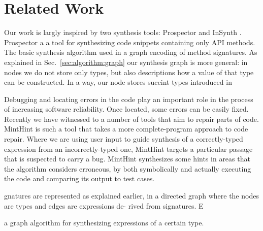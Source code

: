 \section{Related Work}
\label{sec:related}

Our work is largly inspired by two synthesis tools: Prospector \cite{MandelinetALL2005Jungloid} and InSynth \cite{GveroETAL13CompleteCompletionTypesWeights, DBLP:conf/cav/GveroKP11}.
Prospector a a tool for synthesizing code snippets containing only API methods. The basic synthesis algorithm used in  a graph encoding of method signatures. As explained in Sec.~\ref{sec:algorithm:graph}
our synthesis graph is more general: in nodes we do not store only types, but also descriptions how a value of that type can be constructed. In a way, our node stores succint types introduced in  \cite{GveroETAL13CompleteCompletionTypesWeights}




Debugging and locating errors in the code \cite{Pavlinovic:2014,
  Chandra:2011:AD} play an important role in the process of increasing
software reliability. Once located, some errors can be easily
fixed. Recently we have witnessed to a number of tools that aim to
repair parts of code. MintHint \cite{MintHint} is such a tool that
takes a more complete-program approach to code repair. Where we are
using user input to guide synthesis of a correctly-typed expression
from an incorrectly-typed one, MintHint targets a particular passage
that is suspected to carry a bug. MintHint synthesizes some hints in
areas that the algorithm considers erroneous, by both symbolically and
actually executing the code and comparing its output to test cases.




gnatures are represented as explained earlier, in a directed
graph where the nodes are types and edges are expressions de-
rived from signatures. E


a graph algorithm for synthesizing expressions of a certain type. 

